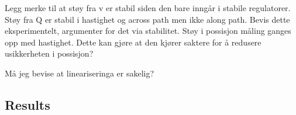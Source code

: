 Legg merke til at støy fra v er stabil siden den bare inngår i stabile regulatorer.
Støy fra Q er stabil i hastighet og across path men ikke along path. Bevis dette eksperimentelt, argumenter for det via stabilitet.
Støy i possisjon måling ganges opp med hastighet. Dette kan gjøre at den kjører saktere for å redusere usikkerheten i possisjon?

Må jeg bevise at lineariseringa er sakelig?

\subsection{Results}